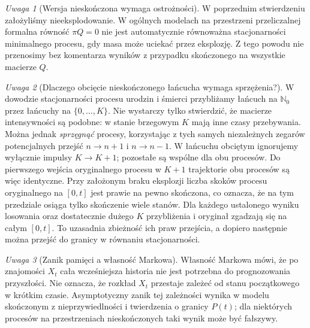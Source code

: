 \documentclass[11pt,a4paper,oneside]{report}
\numberwithin{equation}{chapter}
\theoremstyle{plain}
\theoremstyle{definition}
\theoremstyle{remark}
\newtheorem{uwaga}{Uwaga}[chapter]
\newcommand{\N}{\mathbb{N}}
\begin{document}
\begin{uwaga}[Wersja nieskończona wymaga ostrożności]
W poprzednim stwierdzeniu założyliśmy nieeksplodowanie.
W ogólnych modelach na przestrzeni przeliczalnej
formalna równość $\pi Q=0$ nie jest automatycznie
równoważna stacjonarności minimalnego procesu,
gdy masa może uciekać przez eksplozję. Z tego powodu
nie przenosimy bez komentarza wyników z przypadku
skończonego na wszystkie macierze $Q$.
\end{uwaga}


\begin{uwaga}[Dlaczego obcięcie nieskończonego łańcucha wymaga sprzężenia?]
W dowodzie stacjonarności procesu urodzin i śmierci
przybliżamy łańcuch na $\N_0$ przez łańcuchy na
$\{0,\ldots,K\}$. Nie wystarczy tylko stwierdzić, że
macierze intensywności są podobne: w stanie brzegowym $K$
mają inne czasy przebywania. Można jednak \emph{sprzęgnąć}
procesy, korzystając z tych samych niezależnych zegarów
potencjalnych przejść $n\to n+1$ i $n\to n-1$.
W łańcuchu obciętym ignorujemy wyłącznie impulsy
$K\to K+1$; pozostałe są wspólne dla obu procesów.
Do pierwszego wejścia oryginalnego procesu w $K+1$
trajektorie obu procesów są więc identyczne.
Przy założonym braku eksplozji liczba skoków procesu
oryginalnego na $[0,t]$ jest prawie na pewno skończona,
co oznacza, że na tym przedziale osiąga tylko skończenie
wiele stanów. Dla każdego ustalonego wyniku losowania
oraz dostatecznie dużego $K$ przybliżenia i oryginał
zgadzają się na całym $[0,t]$.
To uzasadnia zbieżność ich praw przejścia, a dopiero
następnie można przejść do granicy w równaniu stacjonarności.
\end{uwaga}

\begin{uwaga}[Zanik pamięci a własność Markowa]
Własność Markowa mówi, że po znajomości $X_t$ cała
wcześniejsza historia nie jest potrzebna do prognozowania
przyszłości. Nie oznacza, że rozkład $X_t$ przestaje
zależeć od stanu początkowego w krótkim czasie.
Asymptotyczny zanik tej zależności wynika w modelu
skończonym z nieprzywiedlności i twierdzenia o granicy
$P(t)$; dla niektórych procesów na przestrzeniach
nieskończonych taki wynik może być fałszywy.
\end{uwaga}
\end{document}
